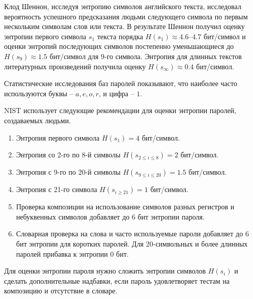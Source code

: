\documentclass[10pt,a4paper]{book}
\begin{document}
Клод Шеннон, исследуя энтропию символов английского текста, исследовал вероятность успешного предсказания людьми следующего символа по первым нескольким символам слов или текста. В результате Шеннон получил оценку энтропии первого символа $s_1$ текста порядка $H(s_1) \approx 4.6$--$4.7$ бит/символ и оценки энтропий последующих символов постепенно уменьшающиеся до $H(s_9) \approx 1.5$ бит/символ для 9-го символа. Энтропия для длинных текстов литературных произведений получила оценку $H(s_\infty) \approx 0.4$ бит/символ.

Статистические исследования баз паролей показывают, что наиболее часто используются буквы -- $a,e,o,r$, и цифра -- $1$.

NIST использует следующие рекомендации для оценки энтропии паролей, создаваемых людьми.
\begin{enumerate}
    \item Энтропия первого символа $H(s_1) = 4$ бит/символ.
    \item Энтропия со 2-го по 8-й символы $H(s_{2 \leq i \leq 8}) = 2$ бит/символ.
    \item Энтропия с 9-го по 20-й символы $H(s_{9 \leq i \leq 20}) = 1.5$ бит/символ.
    \item Энтропия с 21-го символа $H(s_{i \geq 21}) = 1$ бит/символ.
    \item Проверка композиции на использование символов разных регистров и небуквенных символов добавляет до 6 бит энтропии пароля.
    \item Словарная проверка на слова и часто используемые пароли добавляет до 6 бит энтропии для коротких паролей. Для 20-символьных и более длинных паролей прибавка к энтропии   0 бит.
\end{enumerate}

Для оценки энтропии пароля нужно сложить энтропии символов $H(s_i)$ и сделать дополнительные надбавки, если пароль удовлетворяет тестам на композицию и отсутствие в словаре.
\end{document}
